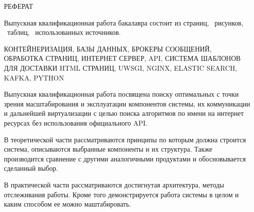 \begin{center}
РЕФЕРАТ
\end{center}









Выпускная квалификационная работа бакалавра состоит из \pageref{LastPage}
страниц, \totfig{}\ рисунков, \tottab{}\ таблиц, \ использованных
источников.

\noindent КОНТЕЙНЕРИЗАЦИЯ, БАЗЫ ДАННЫХ, БРОКЕРЫ СООБЩЕНИЙ, ОБРАБОТКА СТРАНИЦ, ИНТЕРНЕТ
СЕРВЕР, API, СИСТЕМА ШАБЛОНОВ ДЛЯ ДОСТАВКИ HTML СТРАНИЦ, UWSGI, NGINX, ELASTIC
SEARCH, KAFKA, PYTHON

Выпускная квалификационная работа посвящена поиску оптимальных с точки зрения
масштабирования и эксплуатации компонентов системы, их коммуникации и дальнейшей
виртуализации с целью поиска алгоритмов по имени на интернет ресурсах без
использования официального API.

В теоретической части рассматриваются принципы по которым должна строится
система, описываются выбранные компоненты и их структура. Также производится
сравнение с другими аналогичными продуктами и обосновывается сделанный выбор.

В практической части рассматриваются достигнутая архитектура, методы
отслеживания работы. Кроме того демонстрируется работа системы в целом и каким
способом ее можно маштабировать.
